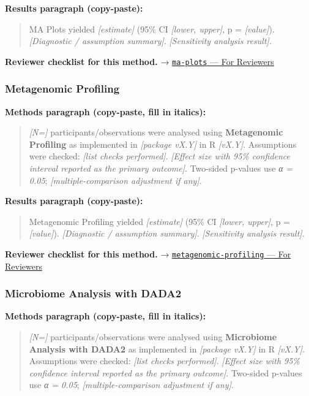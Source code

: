 \documentclass[
]{article}
\begin{document}
\textbf{Results paragraph (copy-paste):}

\begin{quote}
MA Plots yielded \emph{{[}estimate{]}} (95\% CI \emph{{[}lower,
upper{]}}, p = \emph{{[}value{]}}). \emph{{[}Diagnostic / assumption
summary{]}}. \emph{{[}Sensitivity analysis result{]}}.
\end{quote}

\textbf{Reviewer checklist for this method.} →
\href{../chapters/12-bioinformatics/ma-plots.Rmd\#for-reviewers}{\texttt{ma-plots}
--- For Reviewers}

\subsubsection{Metagenomic Profiling}\label{metagenomic-profiling}

\textbf{Methods paragraph (copy-paste, fill in italics):}

\begin{quote}
\emph{{[}N={]}} participants/observations were analysed using
\textbf{Metagenomic Profiling} as implemented in \emph{{[}package
vX.Y{]}} in R \emph{{[}vX.Y{]}}. Assumptions were checked: \emph{{[}list
checks performed{]}}. \emph{{[}Effect size with 95\% confidence interval
reported as the primary outcome{]}}. Two-sided p-values use \emph{α =
0.05}; \emph{{[}multiple-comparison adjustment if any{]}}.
\end{quote}

\textbf{Results paragraph (copy-paste):}

\begin{quote}
Metagenomic Profiling yielded \emph{{[}estimate{]}} (95\% CI
\emph{{[}lower, upper{]}}, p = \emph{{[}value{]}}). \emph{{[}Diagnostic
/ assumption summary{]}}. \emph{{[}Sensitivity analysis result{]}}.
\end{quote}

\textbf{Reviewer checklist for this method.} →
\href{../chapters/12-bioinformatics/metagenomic-profiling.Rmd\#for-reviewers}{\texttt{metagenomic-profiling}
--- For Reviewers}

\subsubsection{Microbiome Analysis with
DADA2}\label{microbiome-analysis-with-dada2}

\textbf{Methods paragraph (copy-paste, fill in italics):}

\begin{quote}
\emph{{[}N={]}} participants/observations were analysed using
\textbf{Microbiome Analysis with DADA2} as implemented in
\emph{{[}package vX.Y{]}} in R \emph{{[}vX.Y{]}}. Assumptions were
checked: \emph{{[}list checks performed{]}}. \emph{{[}Effect size with
95\% confidence interval reported as the primary outcome{]}}. Two-sided
p-values use \emph{α = 0.05}; \emph{{[}multiple-comparison adjustment if
any{]}}.
\end{quote}
\end{document}
